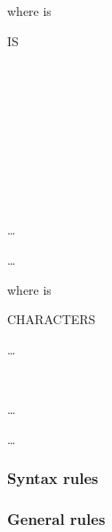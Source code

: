 where  is

\begin{syntax}
    IS
  \begin{1=}
     \\
     \\
     \\
     \\
     \\
    \begin{1=}
      \literal
      \begin{0-1}
        \begin{1=}
           \\
        \end{1=}
        \literal \\
        \begin{1=}
           \literal
        \end{1=}\ldots
      \end{0-1}
    \end{1=}\ldots
  \end{1=}
\end{syntax}

where  is

\begin{syntax}
   CHARACTERS
  \begin{1=}
    \begin{1=}
    \end{1=}\ldots
    \begin{1=}
       \\
    \end{1=}
    \begin{1=}
      \integer
    \end{1=}\ldots
  \end{1=}\ldots
  \begin{0-1}
     
  \end{0-1}
\end{syntax}

\subsubsection{Syntax rules}

\subsubsection{General rules}

